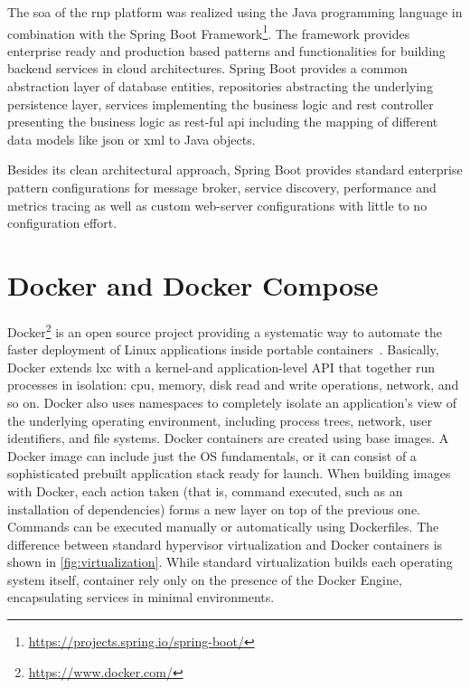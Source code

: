 \documentclass[
a4paper,
twoside,
headsepline,
cleardoublepage=empty,
parskip=half,
draft=false
]{scrbook}
\begin{document}
			The \gls{soa} of the \gls{rnp} platform was realized using the Java programming language in combination with the Spring Boot Framework\footnote{\url{https://projects.spring.io/spring-boot/}}. The framework provides enterprise ready and production based patterns and functionalities for building backend services in cloud architectures. Spring Boot provides a common abstraction layer of database entities, repositories abstracting the underlying persistence layer, services implementing the business logic and \gls{rest} controller presenting the business logic as \gls{rest}-ful \gls{api} including the mapping of different data models like \gls{json} or \gls{xml} to Java objects.
			
			Besides its clean architectural approach, Spring Boot provides standard enterprise pattern configurations for message broker, service discovery, performance and metrics tracing as well as custom web-server configurations with little to no configuration effort.

		\section{Docker and Docker Compose}\label{sec:docker}
		
			Docker\footnote{\url{https://www.docker.com/}} is an open source project providing a systematic way to automate the faster deployment of Linux applications inside portable containers~\cite{bernstein2014containers}. 
			Basically, Docker extends \gls{lxc} with a kernel-and application-level API that together run processes in isolation: \gls{cpu}, memory, disk read and write operations, network, and so on. 
			Docker also uses namespaces to completely isolate an application’s view of the underlying operating environment, including process trees, network, user identifiers, and file systems.
			Docker containers are created using base images.
			A Docker image can include just the OS fundamentals, or it can consist of a sophisticated prebuilt application stack ready for launch. 
			When building images with Docker, each action taken (that is, command executed, such as an installation of dependencies) forms a new layer on top of the previous one. 
			Commands can be executed manually or automatically using Dockerfiles.
			The difference between standard hypervisor virtualization and Docker containers is shown in \cref{fig:virtualization}.
			While standard virtualization builds each operating system itself, container rely only on the presence of the Docker Engine, encapsulating services in minimal environments.
			
\end{document}
